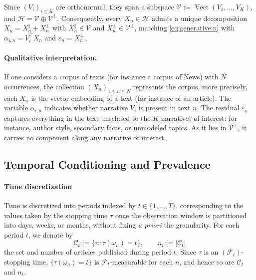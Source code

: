\documentclass[
  journal=medium,
  manuscript=article-type,
  year=2025,
  volume=1,
]{cup-journal}
\begin{document}
Since $(V_i)_{i\le K}$ are orthonormal, they span a subspace $\mathcal V :=
\operatorname{Vect}(V_1,\ldots,V_K)$, and $\mathcal H = \mathcal V \oplus
\mathcal V^\perp$. Consequently, every $X_n \in \mathcal H$ admits a unique
decomposition $X_n = X_n^\parallel + X_n^\perp$ with $X_n^\parallel \in
\mathcal V$ and $X_n^\perp \in \mathcal V^\perp$, matching
\eqref{eq:generative:n} with $\alpha_{i,n} = V_i^\top X_n$ and $\varepsilon_n
= X_n^\perp$.

\paragraph{Qualitative interpretation.} If one considers a corpus of texts (for instance a corpus of News) with $N$ occurrences, the collection $(X_n)_{1 \le n \le N}$ represents the corpus, more precisely, each $X_n$ is the vector embedding of a text (for instance of an article). The variable $\alpha_{i,n}$ indicates whether narrative $V_i$ is
present in text $n$. The residual $\varepsilon_n$ captures everything in the text unrelated to the
$K$ narratives of interest: for instance, author style, secondary facts, or unmodeled topics. As it lies in $\mathcal V^\perp$, it carries no component along any narrative of interest.  

\subsection{Temporal Conditioning and Prevalence}
\label{sec:model:prevalence}

\paragraph{Time discretization}
Time is discretized into periods indexed by $t \in \{1,\ldots,T\}$,
corresponding to the values taken by the stopping time $\tau$ once the
observation window is partitioned into days, weeks, or months, without fixing
\emph{a priori} the granularity. For each period $t$, we denote by
\begin{equation}
    \mathcal C_t := \{n : \tau(\omega_n) = t\}, \qquad n_t := |\mathcal C_t|
\end{equation}
the set and number of articles published during period $t$. Since $\tau$ is
an $(\mathcal F_t)$-stopping time, $\{\tau(\omega_n) = t\}$ is $\mathcal
F_t$-measurable for each $n$, and hence so are $\mathcal C_t$ and $n_t$.
\end{document}
